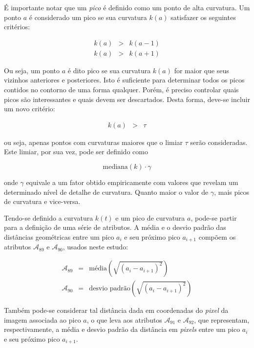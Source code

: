 É importante notar que um \emph{pico} é definido como um ponto de alta
curvatura. Um ponto $a$ é considerado um pico se sua curvatura $k(a)$
satisfazer os seguintes critérios:

\begin{eqnarray}
	k(a) & > & k(a-1) \\
	k(a) & > & k(a+1)
\end{eqnarray}

Ou seja, um ponto $a$ é dito pico se sua curvatura $k(a)$ for maior
que seus vizinhos anteriores e posteriores. Isto é suficiente para
determinar todos os picos contidos no contorno de uma forma
qualquer. Porém, é preciso controlar quais picos são interessantes e
quais devem ser descartados. Desta forma, deve-se incluir um novo
critério:

\begin{eqnarray}
  k(a) & > & \tau
\end{eqnarray}

\noindent ou seja, apenas pontos com curvaturas maiores que o limiar
$\tau$ serão consideradas. Este limiar, por sua vez, pode ser definido
como

\begin{equation}
	\text{mediana}\left(k\right) \cdot \gamma 
\end{equation}

\noindent onde $\gamma$ equivale a um fator obtido empiricamente com valores que
revelam um determinado nível de detalhe de curvatura. Quanto maior o valor de
$\gamma$, mais picos de curvatura e vice-versa.

Tendo-se definido a curvatura $k(t)$ e um pico de curvatura $a$, pode-se partir
para a definição de uma série de atributos. A média e o desvio padrão das
distâncias geométricas entre um pico $a_{i}$ e seu próximo pico $a_{i+1}$
compõem os atributos $\mathcal{A}_{89}$ e $\mathcal{A}_{90}$, usados neste
estudo:

\begin{eqnarray}
  \mathcal{A}_{89} & = & \text{média}(\sqrt{(a_{i} - a_{i+1})^2}) \\
  \mathcal{A}_{90} & = & \text{desvio padrão}(\sqrt{(a_{i} - a_{i+1})^2})
\end{eqnarray}

\noindent Também pode-se considerar tal distância dada em coordenadas do \textit{pixel}
da imagem associada ao pico $a$, o que leva aos atributos $\mathcal{A}_{91}$ e
$\mathcal{A}_{92}$, que representam, respectivamente, a média e desvio padrão da
distância em \textit{pixels} entre um pico $a_{i}$ e seu próximo pico $a_{i+1}$.

